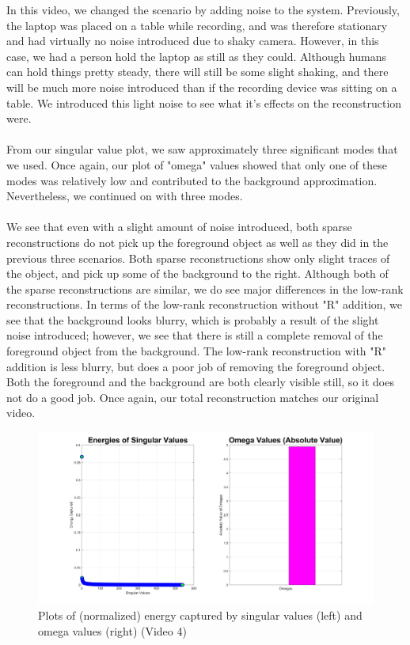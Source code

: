 \documentclass{article}
\begin{document}
In this video, we changed the scenario by adding noise to the system. Previously, the laptop was placed on a table while recording, and was therefore stationary and had virtually no noise introduced due to shaky camera. However, in this case, we had a person hold the laptop as still as they could. Although humans can hold things pretty steady, there will still be some slight shaking, and there will be much more noise introduced than if the recording device was sitting on a table. We introduced this light noise to see what it's effects on the reconstruction were. \\ \\
From our singular value plot, we saw approximately three significant modes that we used. Once again, our plot of "omega" values showed that only one of these modes was relatively low and contributed to the background approximation. Nevertheless, we continued on with three modes. \\ \\
We see that even with a slight amount of noise introduced, both sparse reconstructions do not pick up the foreground object as well as they did in the previous three scenarios. Both sparse reconstructions show only slight traces of the object, and pick up some of the background to the right. Although both of the sparse reconstructions are similar, we do see major differences in the low-rank reconstructions. In terms of the low-rank reconstruction without "R" addition, we see that the background looks blurry, which is probably a result of the slight noise introduced; however, we see that there is still a complete removal of the foreground object from the background. The low-rank reconstruction with "R" addition is less blurry, but does a poor job of removing the foreground object. Both the foreground and the background are both clearly visible still, so it does not do a good job. Once again, our total reconstruction matches our original video.
\begin{figure}[H]
\begin{center}
\includegraphics[width = 12cm]{energy5}
\caption{\label{fig:scaled_diss} Plots of (normalized) energy captured by singular values (left) and omega values (right) (Video 4)}
\end{center}
\end{figure}
\end{document}
